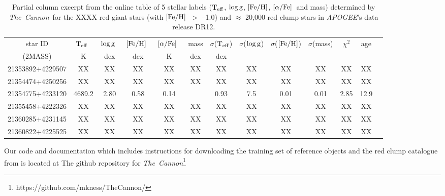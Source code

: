 \documentclass[12pt, preprint]{aastex}
\newcommand{\project}[1]{\textsl{#1}}
\newcommand{\tc}{\project{The~Cannon}}
\newcommand{\apogee}{\project{APOGEE}}
\newcommand{\teff}{\mbox{$\rm T_{eff}$}}
\newcommand{\feh}{\mbox{$\rm [Fe/H]$}}
\newcommand{\alphafe}{\mbox{$\rm [\alpha/Fe]$}}
\newcommand{\logg}{\mbox{$\rm \log g$}}
\begin{document}
\begin{table}[!h]
\tiny{
\centering
\caption{Partial column excerpt from the online table of 5 stellar labels (\teff, \logg, \feh, \alphafe\ and mass) determined by \tc\ for the XXXX red giant stars (with \feh\ $>$ --1.0) and $\approx$ 20,000 red clump stars in \apogee 's data release DR12. } 
\vspace{10pt}
\begin{tabular}{| c | c | c |  c | c | c |  c | c | c | c | c | c | c | } %
\hline
\small{star ID}  & \teff\ & \logg\ & \feh\ & \alphafe\ & mass & $\sigma$(\teff) & $\sigma$(\logg) & $\sigma$(\feh) & $\sigma$(mass)& $\chi^2$ & \tiny{age} \\
\small{(2MASS)} & K & dex &  dex  & K & dex & dex &  & & & &    \\    
\hline
\tiny{21353892+4229507} & XX & XX  & XX  & XX & XX  & XX  & XX & XX & XX & XX & XX\\
\tiny{21354474+4250256} & XX & XX  & XX  & XX & XX  & XX  & XX & XX & XX & XX & XX\\\tiny{21354775+4233120} & 4689.2 & 2.80  & 0.58  & 0.14 &   & 0.93  & 7.5 & 0.01 & 0.01 & 2.85 & 12.9 \\
\tiny{21355458+4222326} & XX & XX  & XX  & XX & XX  & XX  & XX & XX & XX & XX & XX\\
\tiny{21360285+4231145} & XX & XX  & XX  & XX & XX  & XX  & XX & XX & XX & XX & XX\\
\tiny{21360822+4225525} & XX & XX  & XX  & XX & XX  & XX  & XX & XX & XX & XX & XX\\
\hline
\end{tabular}
\label{tab:online} }
\end{table}  





Our code and documentation which includes instructions for downloading the training set of reference objects and the red clump catalogue from \citet{Bovy2014} is located at The github repository for \tc \footnote{https://github.com/mkness/TheCannon/}

\end{document}
